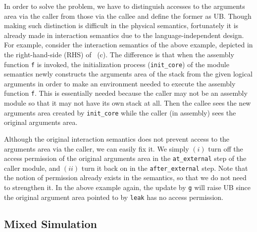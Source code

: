 %
In order to solve the problem, we have to distinguish accesses to the
arguments area via the caller from those via the callee and define the
former as UB. Though making such distinction is difficult in the
physical semantics, fortunately it is already made in interaction
semantics due to the language-independent design. For example, consider
the interaction semantics of the above example, depicted in the
right-hand-side (RHS) of ~(c).  The
difference is that when the assembly function \texttt{f} is invoked,
the initialization process (\ie \texttt{init\_core}) of the module
semantics newly constructs the arguments area of the stack from the
given logical arguments in order to make an environment needed to
execute the assembly function \texttt{f}. This is essentially needed
because the caller may not be an assembly module so that it may not
have its own stack at all.  Then the callee sees the new arguments
area created by \texttt{init\_core} while the caller (in assembly)
sees the original arguments area.

Although the original interaction semantics does not prevent access to
the arguments area via the caller, we can easily fix it.
We simply $(i)$ turn off the access
permission of the original arguments area in the \texttt{at\_external}
step of the caller module, and $(ii)$ turn it back on in the
\texttt{after\_external} step. Note that the notion of permission
already exists in the \cc{} semantics, so that we do not
need to strengthen it. In the above example again,
the update by \texttt{g} will raise UB since the original argument area pointed
to by \texttt{leak} has no access permission.


\subsection{Mixed Simulation}
\label{sec:overview-verification:mixedsim}

